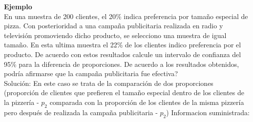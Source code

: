 \documentclass[base=hide,12pt]{elegantbook}
\begin{document}
	
\textcolor{col1}{\bf Ejemplo}\\	
 En una muestra de 200 clientes, el 20\% indica preferencia por tamaño especial de pizza. Con posterioridad a una campaña publicitaria realizada en radio y televisión promoviendo dicho producto, se selecciono una muestra de igual tamaño. En esta ultima muestra el 22\% de los clientes indico preferencia por el producto. De acuerdo con estos resultados calcule un intervalo de confianza del 95\% para la diferencia de proporciones. De acuerdo a los resultados obtenidos, podría afirmarse que la campaña publicitaria fue efectiva? \\
	Solución: En este caso se trata de la comparación de dos proporciones (proporción de clientes que prefieren el tamaño especial dentro de los clientes de la pizzería - $p_{2}$ comparada con la proporción de los clientes de la misma pizzería pero después de realizada la campaña publicitaria - $p_{2}$)
	Informacion suministrada:
\end{document}
